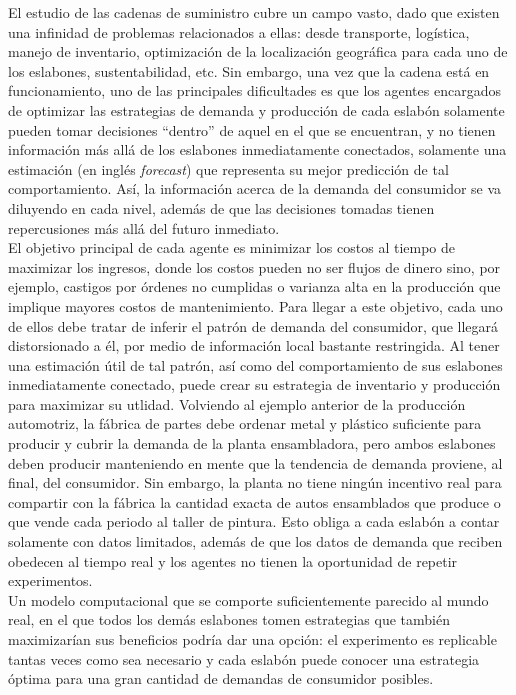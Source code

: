 El estudio de las cadenas de suministro cubre un campo vasto, dado que existen una infinidad de problemas relacionados a ellas: desde transporte, log\'istica, manejo de inventario, optimizaci\'on de la localizaci\'on geogr\'afica para cada uno de los eslabones, sustentabilidad, etc. Sin embargo, una vez que la cadena est\'a en funcionamiento, uno de las principales dificultades es que los agentes encargados de optimizar las estrategias de demanda y producci\'on de cada eslab\'on solamente pueden tomar decisiones ``dentro'' de aquel en el que se encuentran, y no tienen informaci\'on m\'as all\'a de los eslabones inmediatamente conectados, solamente una estimaci\'on (en ingl\'es \textit{forecast}) que representa su mejor predicci\'on de tal comportamiento. As\'i, la informaci\'on acerca de la demanda del consumidor se va diluyendo en cada nivel, además de que las decisiones tomadas tienen repercusiones m\'as all\'a del futuro inmediato. \\

El objetivo principal de cada agente es minimizar los costos al tiempo de maximizar los ingresos, donde los costos pueden no ser flujos de dinero sino, por ejemplo, castigos por \'ordenes no cumplidas o varianza alta en la producci\'on que implique mayores costos de mantenimiento. Para llegar a este objetivo, cada uno de ellos debe tratar de inferir el patr\'on de demanda del consumidor, que llegar\'a distorsionado a \'el, por medio de información local bastante restringida. Al tener una estimaci\'on \'util de tal patr\'on, as\'i como del comportamiento de sus eslabones inmediatamente conectado, puede crear su estrategia de inventario y producci\'on para maximizar su utlidad. Volviendo al ejemplo anterior de la producci\'on automotriz, la f\'abrica de partes debe ordenar metal y pl\'astico suficiente para producir y cubrir la demanda de la planta ensambladora, pero ambos eslabones deben producir manteniendo en mente que la tendencia de demanda proviene, al final, del consumidor. Sin embargo, la planta no tiene ning\'un incentivo real para compartir con la f\'abrica la cantidad exacta de autos ensamblados que produce o que vende cada periodo al taller de pintura. Esto obliga a cada eslab\'on a contar solamente con datos limitados, adem\'as de que los datos de demanda que reciben obedecen al tiempo real y los agentes no tienen la oportunidad de repetir experimentos.\\

Un modelo computacional que se comporte suficientemente parecido al mundo real, en el que todos los demás eslabones tomen estrategias que también maximizarían sus beneficios podría dar una opción: el experimento es replicable tantas veces como sea necesario y cada eslabón puede conocer una estrategia óptima para una gran cantidad de demandas de consumidor posibles.\\

